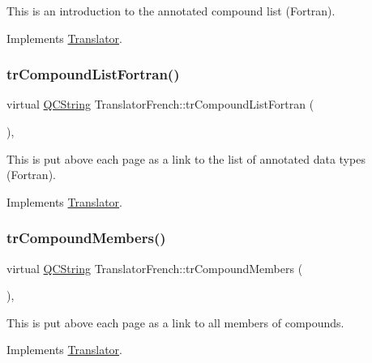 This is an introduction to the annotated compound list (Fortran). 

Implements \mbox{\hyperlink{class_translator}{Translator}}.

\mbox{\label{class_translator_french_a1c6a666ae45a0def06d0438a9a378505}} 
\subsubsection{\texorpdfstring{trCompoundListFortran()}{trCompoundListFortran()}}
{\footnotesize\ttfamily virtual \mbox{\hyperlink{class_q_c_string}{Q\+C\+String}} Translator\+French\+::tr\+Compound\+List\+Fortran (\begin{DoxyParamCaption}{ }\end{DoxyParamCaption})\hspace{0.3cm}{\ttfamily [inline]}, {\ttfamily [virtual]}}

This is put above each page as a link to the list of annotated data types (Fortran). 

Implements \mbox{\hyperlink{class_translator}{Translator}}.

\mbox{\label{class_translator_french_ac5a253a87988432e76b3e65093827550}} 
\subsubsection{\texorpdfstring{trCompoundMembers()}{trCompoundMembers()}}
{\footnotesize\ttfamily virtual \mbox{\hyperlink{class_q_c_string}{Q\+C\+String}} Translator\+French\+::tr\+Compound\+Members (\begin{DoxyParamCaption}{ }\end{DoxyParamCaption})\hspace{0.3cm}{\ttfamily [inline]}, {\ttfamily [virtual]}}

This is put above each page as a link to all members of compounds. 

Implements \mbox{\hyperlink{class_translator}{Translator}}.

\mbox{\label{class_translator_french_aaa7da43e1b8e1dfff4dd1089a47a8f87}} 
